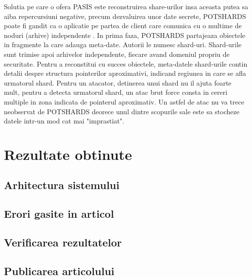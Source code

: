 \documentclass{llncs}
\begin{document}
Solutia pe care o ofera PASIS este reconstruirea share-urilor insa aceasta putea sa aiba repercursiuni negative, precum dezvaluirea unor date secrete,
POTSHARDS poate fi gandit ca o aplicatie pe partea de client care comunica cu o multime de noduri (arhive) independente . In prima faza, POTSHARDS partajeaza obiectele in fragmente la care adauga meta-date. Autorii le numesc shard-uri. Shard-urile sunt trimise apoi arhivelor independente, fiecare avand domeniul propriu de securitate. Pentru a reconstitui cu succes obiectele, meta-datele shard-urile contin detalii despre structura pointerilor aproximativi, indicand regiunea in care se afla urmatorul shard. Pentru un atacator, detinerea unui shard nu il ajuta foarte mult, pentru a detecta urmatorul shard, un atac brut force consta in cereri multiple in zona indicata de pointerul aproximativ. Un astfel de atac nu va trece neobservat de POTSHARDS deorece unul dintre scopurile sale este sa stocheze datele intr-un mod cat mai "imprastiat".\cite{SGMV:2009} 

\section{Rezultate obtinute}
\label{sec:results}
\subsection{Arhitectura sistemului}
\subsection{Erori gasite in articol}
\subsection{Verificarea rezultatelor}
\subsection{Publicarea articolului}

%
%
%



\end{document}
